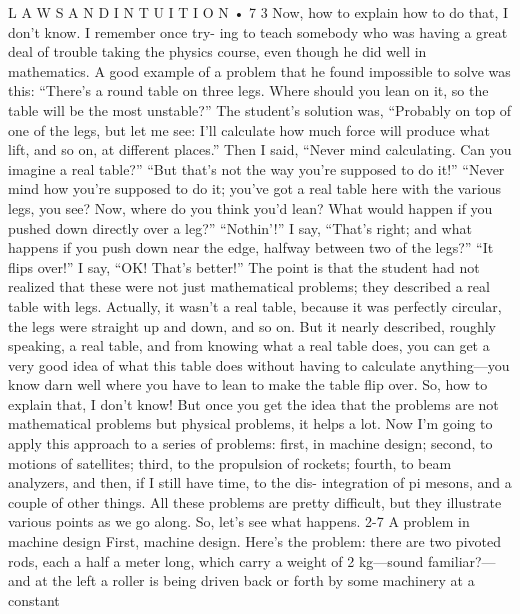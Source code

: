 \documentclass[10pt,oneside]{article}
\begin{document}
L A W S  A N D  I N T U I T I O N • 7 3 Now, how to explain how to do that, I don’t know. I remember once try- ing to teach somebody who was having a great deal of trouble taking the physics course, even though he did well in mathematics. A good example of a problem that he found impossible to solve was this: “There’s a round table on three legs. Where should you lean on it, so the table will be the most unstable?” The student’s solution was, “Probably on top of one of the legs, but let me see: I’ll calculate how much force will produce what lift, and so on, at different places.” Then I said, “Never mind calculating. Can you imagine a real table?” “But that’s not the way you’re supposed to do it!” “Never mind how you’re supposed to do it; you’ve got a real table here with the various legs, you see? Now, where do you think you’d lean? What would happen if you pushed down directly over a leg?” “Nothin’!” I say, “That’s right; and what happens if you push down near the edge, halfway between two of the legs?” “It flips over!” I say, “OK! That’s better!” The point is that the student had not realized that these were not just mathematical problems; they described a real table with legs. Actually, it wasn’t a real table, because it was perfectly circular, the legs were straight up and down, and so on. But it nearly described, roughly speaking, a real table, and from knowing what a real table does, you can get a very good idea of what this table does without having to calculate anything---you know darn well where you have to lean to make the table flip over. So, how to explain that, I don’t know! But once you get the idea that the problems are not mathematical problems but physical problems, it helps a lot. Now I’m going to apply this approach to a series of problems: first, in machine design; second, to motions of satellites; third, to the propulsion of rockets; fourth, to beam analyzers, and then, if I still have time, to the dis- integration of pi mesons, and a couple of other things. All these problems are pretty difficult, but they illustrate various points as we go along. So, let’s see what happens. 2-7 A problem in machine design First, machine design. Here’s the problem: there are two pivoted rods, each a half a meter long, which carry a weight of 2 kg---sound familiar?---and at the left a roller is being driven back or forth by some machinery at a constant\par
\end{document}
